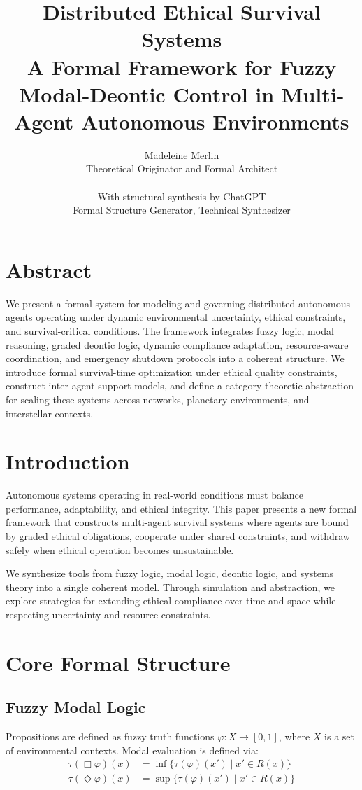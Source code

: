 \documentclass[11pt]{article}
\title{Distributed Ethical Survival Systems \\ \large A Formal Framework for Fuzzy Modal-Deontic Control in Multi-Agent Autonomous Environments}
\author{Madeleine Merlin \\ \small Theoretical Originator and Formal Architect \\ \\ With structural synthesis by ChatGPT \\ \small Formal Structure Generator, Technical Synthesizer}
\date{}
\begin{document}
\maketitle

\section*{Abstract}
We present a formal system for modeling and governing distributed autonomous agents operating under dynamic environmental uncertainty, ethical constraints, and survival-critical conditions. The framework integrates fuzzy logic, modal reasoning, graded deontic logic, dynamic compliance adaptation, resource-aware coordination, and emergency shutdown protocols into a coherent structure. We introduce formal survival-time optimization under ethical quality constraints, construct inter-agent support models, and define a category-theoretic abstraction for scaling these systems across networks, planetary environments, and interstellar contexts.

\section{Introduction}
Autonomous systems operating in real-world conditions must balance performance, adaptability, and ethical integrity. This paper presents a new formal framework that constructs multi-agent survival systems where agents are bound by graded ethical obligations, cooperate under shared constraints, and withdraw safely when ethical operation becomes unsustainable.

We synthesize tools from fuzzy logic, modal logic, deontic logic, and systems theory into a single coherent model. Through simulation and abstraction, we explore strategies for extending ethical compliance over time and space while respecting uncertainty and resource constraints.

\section{Core Formal Structure}
\subsection{Fuzzy Modal Logic}
Propositions are defined as fuzzy truth functions $\varphi: X \rightarrow [0,1]$, where $X$ is a set of environmental contexts. Modal evaluation is defined via:
\begin{align*}
\tau(\Box \varphi)(x) &= \inf \{ \tau(\varphi)(x') \mid x' \in R(x) \} \\
\tau(\Diamond \varphi)(x) &= \sup \{ \tau(\varphi)(x') \mid x' \in R(x) \}
\end{align*}
\end{document}
